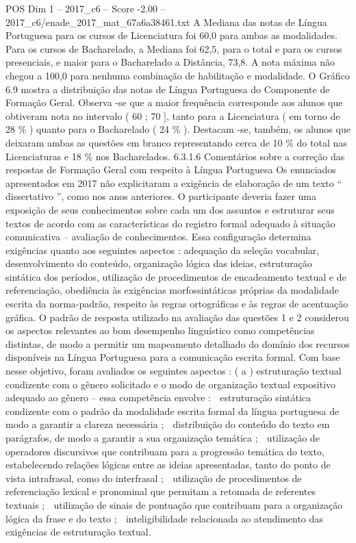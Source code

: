 \begin{textsample}{POS Dim 1 – 2017\_c6 – Score -2.00 – 2017\_c6/enade\_2017\_mat\_67a6a38461.txt}
A Mediana das notas de Língua Portuguesa para os cursos de Licenciatura foi 60,0 para ambas as modalidades.
Para os cursos de Bacharelado, a Mediana foi 62,5, para o total e para os cursos presenciais, e maior para o Bacharelado a Distância, 73,8.
A nota máxima não chegou a 100,0 para nenhuma combinação de habilitação e modalidade.
O Gráfico 6.9 mostra a distribuição das notas de Língua Portuguesa do Componente de Formação Geral.
Observa -se que a maior frequência corresponde aos alunos que obtiveram nota no intervalo ( 60 ; 70 ], tanto para a Licenciatura ( em torno de 28 \% ) quanto para o Bacharelado ( 24 \% ).
Destacam -se, também, os alunos que deixaram ambas as questões em branco representando cerca de 10 \% do total nas Licenciaturas e 18 \% nos Bacharelados. 6.3.1.6 Comentários sobre a correção das respostas de Formação Geral com respeito à Língua Portuguesa Os enunciados apresentados em 2017 não explicitaram a exigência de elaboração de um texto “ dissertativo ”, como nos anos anteriores.
O participante deveria fazer uma exposição de seus conhecimentos sobre cada um dos assuntos e estruturar seus textos de acordo com as características do registro formal adequado à situação comunicativa – avaliação de conhecimentos.
Essa configuração determina exigências quanto aos seguintes aspectos : adequação da seleção vocabular, desenvolvimento do conteúdo, organização lógica das ideias, estruturação sintática dos períodos, utilização de procedimentos de encadeamento textual e de referenciação, obediência às exigências morfossintáticas próprias da modalidade escrita da norma-padrão, respeito às regras ortográficas e às regras de acentuação gráfica.
O padrão de resposta utilizado na avaliação das questões 1 e 2 considerou os aspectos relevantes ao bom desempenho linguístico como competências distintas, de modo a permitir um mapeamento detalhado do domínio dos recursos disponíveis na Língua Portuguesa para a comunicação escrita formal.
Com base nesse objetivo, foram avaliados os seguintes aspectos : ( a ) estruturação textual condizente com o gênero solicitado e o modo de organização textual expositivo adequado ao gênero – essa competência envolve :  estruturação sintática condizente com o padrão da modalidade escrita formal da língua portuguesa de modo a garantir a clareza necessária ;  distribuição do conteúdo do texto em parágrafos, de modo a garantir a sua organização temática ;  utilização de operadores discursivos que contribuam para a progressão temática do texto, estabelecendo relações lógicas entre as ideias apresentadas, tanto do ponto de vista intrafrasal, como do interfrasal ;  utilização de procedimentos de referenciação lexical e pronominal que permitam a retomada de referentes textuais ;  utilização de sinais de pontuação que contribuam para a organização lógica da frase e do texto ;  inteligibilidade relacionada ao atendimento das exigências de estruturação textual.

\end{textsample}
